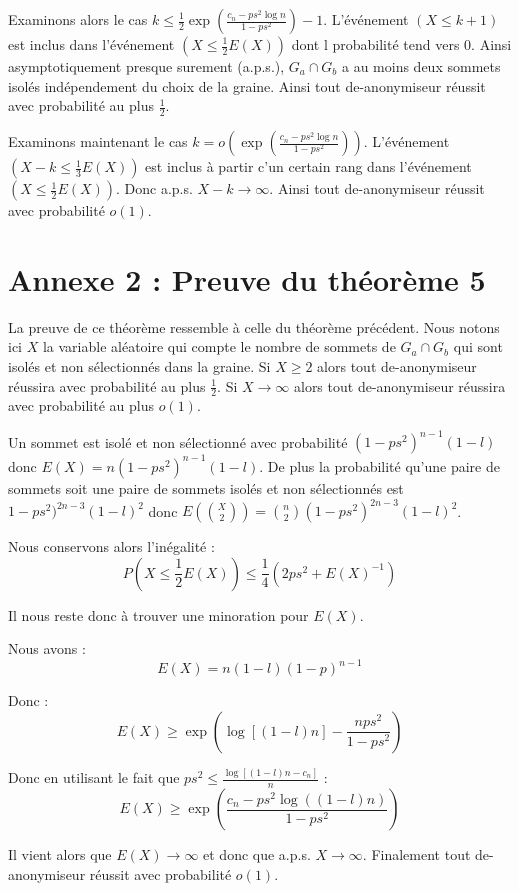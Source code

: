 \documentclass[letterpaper,10pt]{llncs}
\begin{document}
Examinons alors le cas $k \leq \frac{1}{2} \exp(\frac{c_n - ps^{2} \log n}{1-ps^{2}}) - 1$. L'événement $(X \leq k+1)$ est inclus dans l'événement $(X \leq \frac{1}{2} E(X))$ dont l probabilité tend vers $0$. Ainsi asymptotiquement presque surement (a.p.s.), $G_a \cap G_b$ a au moins deux sommets isolés indépendement du choix de la graine. Ainsi tout de-anonymiseur réussit avec probabilité au plus $\frac{1}{2}$.

Examinons maintenant le cas $k = o( \exp(\frac{c_n - ps^{2} \log n}{1-ps^{2}}))$. L'événement $(X - k \leq \frac{1}{3} E(X))$ est inclus à partir c'un certain rang dans l'événement $(X \leq \frac{1}{2} E(X))$. Donc a.p.s. $X-k \rightarrow \infty$. Ainsi tout de-anonymiseur réussit avec probabilité $o(1)$.

\section*{Annexe 2 : Preuve du théorème 5}

La preuve de ce théorème ressemble à celle du théorème précédent. Nous notons ici $X$ la variable aléatoire qui compte le nombre de sommets de $G_a \cap G_b$ qui sont isolés et non sélectionnés dans la graine. Si $X \geq 2$ alors tout de-anonymiseur réussira avec probabilité au plus $\frac{1}{2}$. Si $X \rightarrow \infty$ alors tout de-anonymiseur réussira avec probabilité au plus $o(1)$.

Un sommet est isolé et non sélectionné avec probabilité $(1-ps^2)^{n-1}(1-l)$ donc $E(X) = n(1-ps^2)^{n-1}(1-l)$. De plus la probabilité qu'une paire de sommets soit une paire de sommets isolés et non sélectionnés est $1-ps^2)^{2n-3} (1-l)^2$ donc $E(\binom{X}{2}) = \binom{n}{2} (1-ps^2)^{2n-3} (1-l)^2$.

Nous conservons alors l'inégalité :
\[ P( X \leq \frac{1}{2} E(X)) \leq \frac{1}{4} (2ps^2 + E(X)^{-1})  \]

Il nous reste donc à trouver une minoration pour $E(X)$.

Nous avons :
\[  E(X) = n (1-l) (1-p)^{n-1}  \]

Donc :
\[  E(X) \geq \exp(\log[(1-l)n] - \frac{nps^2}{1-ps^2})  \]

Donc en utilisant le fait que $ps^2 \leq \frac{\log[(1-l)n-c_n]}{n}$ :
\[  E(X) \geq \exp(\frac{c_n-ps^2\log ((1-l)n)}{1-ps^2}) \]

Il vient alors que $E(X) \rightarrow \infty$ et donc que a.p.s. $X \rightarrow \infty$. Finalement tout de-anonymiseur réussit avec probabilité $o(1)$.
\end{document}
